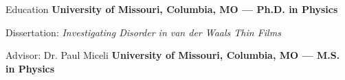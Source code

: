 \begin{rubric}{Education}
    \textbf{University of Missouri, Columbia, MO --- Ph.D. in Physics}
    \par Dissertation: \emph{Investigating Disorder in van der Waals Thin Films}
    \par Advisor: Dr. Paul Miceli
  \entry*[May 2022]%
    \textbf{University of Missouri, Columbia, MO --- M.S. in Physics}

\end{rubric}

